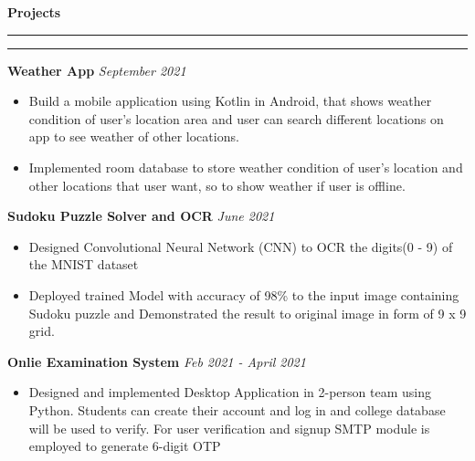 \documentclass[11pt]{article}
\begin{document}
    \textbf{\large{Projects}}
		\vspace{5pt}
    	\hrule \hrule
    	\vspace{4pt}    	
    	\hspace{8pt}
    	\textbf{Weather App}
    	\href{https://github.com/Abhay811/Weather-App}{\color{blue}}
    	\hfill
        \textit{September 2021}
        \vspace{-6pt}
        \begin{itemize}
        	\setlength{\itemsep}{0pt}
        	\setlength{\parskip}{0pt}
        	\setlength{\parsep}{0pt}
        	\item Build a mobile application using Kotlin in Android, that shows weather condition of user's location area and user can search different locations on app to see weather of other locations.
        	\item Implemented room database to store weather condition of user's location and other locations that user want, so to show weather if user is offline.
        \end{itemize}
    	\hspace{8pt}
    	\textbf{Sudoku Puzzle Solver and OCR}
    	\href{https://github.com/Abhay811/Sudoku_solver}{\color{blue}}
    	\hfill
    	\textit{June 2021}
    	\vspace{-6pt}
       	\begin{itemize}
        	\setlength\itemsep{0pt}
        	\setlength\parskip{0pt}
        	\setlength\parsep{0pt}
        	\item  Designed Convolutional Neural Network (CNN) to OCR the digits(0 - 9) of the MNIST dataset
        	\item Deployed trained Model with accuracy of 98\% to the input image containing Sudoku puzzle and Demonstrated the result to original image in form of 9 x 9 grid.
        \end{itemize}
    	\hspace{8pt}
    	\textbf{Onlie Examination System}
    	\href{https://github.com/Abhay811/Advanced-Online-Examination}{\color{blue}}
    	\hfill
    	\textit{Feb 2021 - April 2021}
    	\vspace{-6pt}
    	\begin{itemize}
        	\setlength{\itemsep}{0pt}
        	\setlength{\parskip}{0pt}
        	\setlength{\parsep}{0pt}
        	\item Designed and implemented Desktop Application in 2-person team using Python. Students can create their account and log in and college database will be used to verify. For user verification and signup SMTP module is employed to generate 6-digit OTP
    	\end{itemize}
\end{document}
